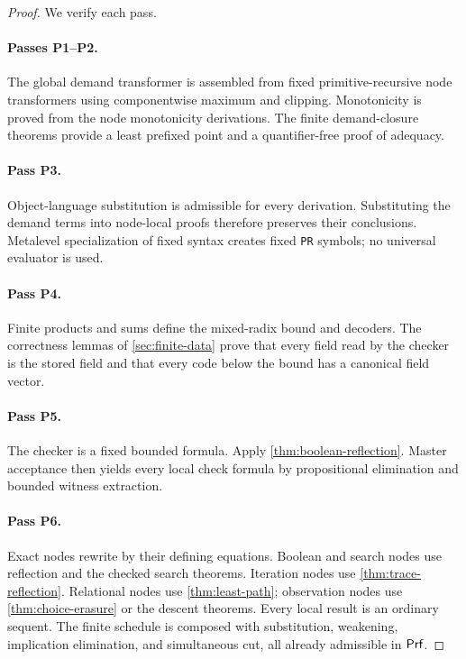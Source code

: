 \begin{proof}
We verify each pass.

\paragraph{Passes P1--P2.}
The global demand transformer is assembled from fixed primitive-recursive node transformers using componentwise maximum and clipping.  Monotonicity is proved from the node monotonicity derivations.  The finite demand-closure theorems provide a least prefixed point and a quantifier-free proof of adequacy.

\paragraph{Pass P3.}
Object-language substitution is admissible for every derivation.  Substituting the demand terms into node-local proofs therefore preserves their conclusions.  Metalevel specialization of fixed syntax creates fixed \texttt{PR} symbols; no universal evaluator is used.

\paragraph{Pass P4.}
Finite products and sums define the mixed-radix bound and decoders.  The correctness lemmas of \cref{sec:finite-data} prove that every field read by the checker is the stored field and that every code below the bound has a canonical field vector.

\paragraph{Pass P5.}
The checker is a fixed bounded formula.  Apply \cref{thm:boolean-reflection}.  Master acceptance then yields every local check formula by propositional elimination and bounded witness extraction.

\paragraph{Pass P6.}
Exact nodes rewrite by their defining equations.  Boolean and search nodes use reflection and the checked search theorems.  Iteration nodes use \cref{thm:trace-reflection}.  Relational nodes use \cref{thm:least-path}; observation nodes use \cref{thm:choice-erasure} or the descent theorems.  Every local result is an ordinary sequent.  The finite schedule is composed with substitution, weakening, implication elimination, and simultaneous cut, all already admissible in \(\mathsf{Prf}\).


\end{proof}
